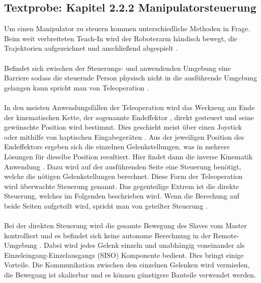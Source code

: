 \subsection{Textprobe: Kapitel 2.2.2 Manipulatorsteuerung}
  Um einen Manipulator zu steuern kommen unterschiedliche Methoden in Frage.
  Beim weit verbreiteten Teach-In wird der Roboterarm händisch bewegt, die Trajektorien aufgezeichnet und anschließend abgespielt \cite[S.190]{ehlers_echtzeitfahige_2019}.\\\\
  Befindet sich zwischen der Steuerungs- und anwendenden Umgebung eine Barriere sodass die steuernde Person physisch nicht in die ausführende Umgebung gelangen kann spricht man von Teleoperation \cite[S.741]{siciliano_springer_2008}.\\\\
  In den meisten Anwendungsfällen der Teleoperation wird das Werkzeug am Ende der kinematischen Kette, der sogenannte Endeffektor \cite[S.8]{mareczek_grundlagen_2020}, direkt gesteuert und seine gewünschte Position wird bestimmt. Dies geschieht meist über einen Joystick oder mithilfe von haptischen Eingabegeräten \cite[S.190]{ehlers_echtzeitfahige_2019}. Aus der jeweiligen Position des Endeffektors ergeben sich die einzelnen Gelenkstellungen, was in mehrere Lösungen für dieselbe Position resultiert. Hier findet dann die inverse Kinematik Anwendung \cite[S.27]{siciliano_springer_2008}. Dazu wird auf der ausführenden Seite eine Steuerung benötigt, welche die nötigen Gelenkstellungen berechnet. Diese Form der Teleoperation wird überwachte Steuerung genannt. Das gegenteilige Extrem ist die direkte Steuerung, welches im Folgenden beschrieben wird. Wenn die Berechung auf beide Seiten aufgeteilt wird, spricht man von geteilter Steuerung \cite[S.746]{siciliano_springer_2008}. \\\\
  Bei der direkten Steuerung wird die gesamte Bewegung des Slaves vom Master kontrolliert und es befindet sich keine autonome Berechnung in der Remote-Umgebung \cite[S.746]{siciliano_springer_2008}.
  Dabei wird jedes Gelenk einzeln und unabhängig voneinander als Einzeleingang-Einzelausgangs (SISO) Komponente bedient. Dies bringt einige Vorteile. Die Kommunikation zwischen den einzelnen Gelenken wird vermieden, die Bewegung ist skalierbar und es können günstigere Bauteile verwendet werden. \cite[S.137]{siciliano_springer_2008}\\\\
